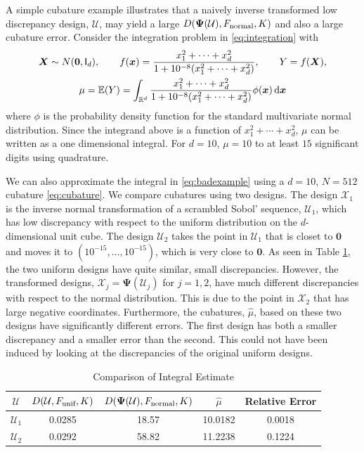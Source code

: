 \documentclass[graybox]{svmult}
\newcommand{\reals}{\mathbb{R}}
\newcommand{\vx}{\boldsymbol{x}}
\newcommand{\vX}{\boldsymbol{X}}
\newcommand{\vzero}{\boldsymbol{0}}
\newcommand{\vPsi}{\boldsymbol{\Psi}}
\newcommand{\dif}{{\rm d}}
\newcommand{\Udes}{\mathcal{U}}
\newcommand{\Xdes}{\mathcal{X}}
\newcommand{\Ex}{\mathbb{E}}
\newcommand{\unif}{\textup{unif}}
\newcommand{\normal}{\textup{normal}}
\begin{document}
\begin{example} A simple cubature example illustrates that a naively inverse transformed low discrepancy design, $\Udes$, may yield a large $D(\vPsi(\Udes),F_\normal, K)$ and also a large cubature error. Consider the integration problem in \eqref{eq:integration} with
\begin{subequations} \label{eq:badexample}
\begin{gather}
\vX \sim  N(\vzero, {\mathsf I}_d), \qquad f(\vx) = \frac{x_1^2+\cdots+x^2_d}{1+10^{-8}(x_1^2+\cdots+x_d^2)}, \qquad Y = f(\vX),\\
\mu = \Ex(Y) = \int_{\reals^d} \frac{x_1^2+\cdots+x^2_d}{1+10^{-8}(x_1^2+\cdots+x_d^2)} \phi(\vx) \, \dif \vx
\end{gather}
\end{subequations}
where $\phi$ is the probability density function for the standard multivariate normal distribution.
Since the integrand above is a function of $x_1^2 + \cdots + x_d^2$, $\mu$ can be written as a one dimensional integral.  For $d=10$, $\mu = 10$ to at least $15$ significant digits using quadrature.

We can also approximate the integral in \eqref{eq:badexample} using a $d=10$, $N=512$ cubature \eqref{eq:cubature}.  We compare cubatures using two designs.  The design $\Xdes_1$ is the inverse normal transformation of a scrambled Sobol' sequence, $\Udes_1$, which has low discrepancy with respect to the uniform distribution on the $d$-dimensional unit cube.  The design $\Udes_2$ takes the point in $\Udes_1$ that is closet to $\vzero$ and moves it to $\left(10^{-15}, \ldots, 10^{-15}\right)$, which is very close to $\vzero$.  As seen in Table \ref{tab:badexample}, the two uniform designs have quite similar, small discrepancies.  However, the transformed designs, $\Xdes_j = \vPsi(\Udes_j)$ for $j=1,2$, have much different discrepancies with respect to the normal distribution.  This is due to the point in $\Xdes_2$ that has large negative coordinates.  Furthermore, the cubatures, $\hat{\mu}$, based on these two designs have significantly different errors.  The first design has both a smaller discrepancy and a smaller error than the second.  This could not have been induced by looking at the discrepancies of the original uniform designs.


\begin{table}[htbp]
  \centering
  \caption{Comparison of Integral Estimate}
    \begin{tabular}{ccccc}
   $\Udes$       & $D(\Udes,F_\unif, K)$     & $D(\vPsi(\Udes),F_\normal, K)$     & $\hat{\mu}$  & Relative Error\\
    \toprule
    $\Udes_1$     &   0.0285    &  18.57     & 10.0182 & 0.0018\\
    $\Udes_2$     &  0.0292      &  58.82     & 11.2238 & 0.1224
    \end{tabular}%
  \label{tab:badexample}%
\end{table}%




\end{example}
\end{document}
